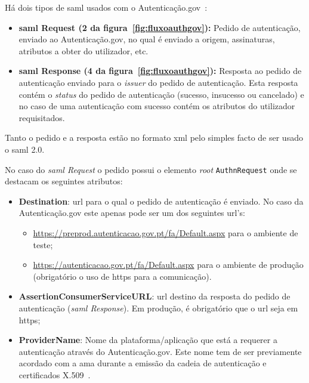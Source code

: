 Há dois tipos de \acrshort{saml} usados com o Autenticação.gov~\cite{otavioTese}:
\begin{itemize}
    \item \textbf{\acrshort{saml} Request (2 da figura~\ref{fig:fluxoauthgov}):} Pedido de autenticação, 
    enviado ao Autenticação.gov, no qual é enviado a origem, assinaturas, atributos a obter do utilizador, etc.
    \item \textbf{\acrshort{saml} Response (4 da figura~\ref{fig:fluxoauthgov}):} Resposta ao pedido de 
    autenticação enviado para o \textit{issuer} do pedido de autenticação. Esta resposta contém o 
    \textit{status} do pedido de autenticação (sucesso, insucesso ou cancelado) e no caso de uma autenticação 
    com sucesso contém os atributos do utilizador requisitados.
\end{itemize}

Tanto o pedido e a resposta estão no formato \acrshort{xml} pelo simples facto de ser usado o \acrshort{saml} 2.0.

No caso do \textit{\acrshort{saml} Request} o pedido possui o elemento \textit{root} \texttt{AuthnRequest} onde 
se destacam os seguintes atributos:
\begin{itemize}
    \item \textbf{Destination}: \acrshort{url} para o qual o pedido de autenticação é enviado. No caso da 
    Autenticação.gov este apenas pode ser um dos seguintes \acrshort{url}'s:
    \begin{itemize}
        \item \url{https://preprod.autenticacao.gov.pt/fa/Default.aspx} para o ambiente de teste;
        \item \url{https://autenticacao.gov.pt/fa/Default.aspx} para o ambiente de produção 
        (obrigatório o uso de \acrshort{https} para a comunicação).
    \end{itemize}
    \item \textbf{AssertionConsumerServiceURL}: \acrshort{url} destino da resposta do pedido de autenticação 
    (\textit{\acrshort{saml} Response}). Em produção, é obrigatório que o \acrshort{url} seja em \acrshort{https};
    \item \textbf{ProviderName}: Nome da plataforma/aplicação que está a requerer a autenticação através do 
    Autenticação.gov. Este nome tem de ser previamente acordado com a \acrshort{ama} durante a emissão da cadeia 
    de autenticação e certificados X.509~\cite{otavioTese}.
\end{itemize}

